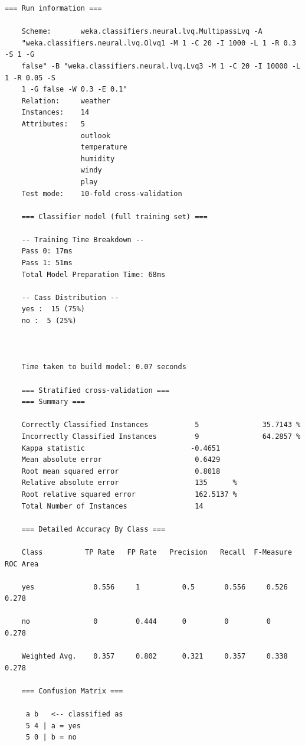 \vspace{1cm}
\begin{lstlisting}[caption=Exemplo de saída de uma execução do WEKA, label=lst:prop_weka_out]
    === Run information ===

    Scheme:       weka.classifiers.neural.lvq.MultipassLvq -A
    "weka.classifiers.neural.lvq.Olvq1 -M 1 -C 20 -I 1000 -L 1 -R 0.3 -S 1 -G
    false" -B "weka.classifiers.neural.lvq.Lvq3 -M 1 -C 20 -I 10000 -L 1 -R 0.05 -S
    1 -G false -W 0.3 -E 0.1"
    Relation:     weather
    Instances:    14
    Attributes:   5
                  outlook
                  temperature
                  humidity
                  windy
                  play
    Test mode:    10-fold cross-validation

    === Classifier model (full training set) ===

    -- Training Time Breakdown --
    Pass 0: 17ms
    Pass 1: 51ms
    Total Model Preparation Time: 68ms

    -- Cass Distribution --
    yes :  15 (75%)
    no :  5 (25%)



    Time taken to build model: 0.07 seconds

    === Stratified cross-validation ===
    === Summary ===

    Correctly Classified Instances           5               35.7143 %
    Incorrectly Classified Instances         9               64.2857 %
    Kappa statistic                         -0.4651
    Mean absolute error                      0.6429
    Root mean squared error                  0.8018
    Relative absolute error                  135      %
    Root relative squared error              162.5137 %
    Total Number of Instances                14

    === Detailed Accuracy By Class ===

    Class          TP Rate   FP Rate   Precision   Recall  F-Measure   ROC Area

    yes              0.556     1          0.5       0.556     0.526      0.278

    no               0         0.444      0         0         0          0.278

    Weighted Avg.    0.357     0.802      0.321     0.357     0.338      0.278

    === Confusion Matrix ===

     a b   <-- classified as
     5 4 | a = yes
     5 0 | b = no
\end{lstlisting}

